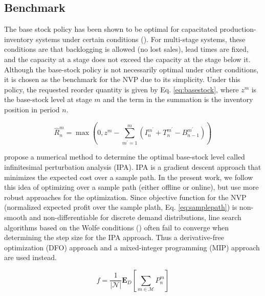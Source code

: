 \documentclass[12pt]{article}
\begin{document}
\subsection{Benchmark}

The base stock policy has been shown to be optimal for capacitated production-inventory systems under certain conditions (\cite{Kapuscinski1999OptimalSystems}). For multi-stage systems, these conditions are that backlogging is allowed (no lost sales), lead times are fixed, and the capacity at a stage does not exceed the capacity at the stage below it. Although the base-stock policy is not necessarily optimal under other conditions, it is chosen as the benchmark for the NVP due to its simplicity. Under this policy, the requested reorder quantity is given by Eq. \ref{eq:basestock}, where $z^m$ is the base-stock level at stage $m$ and the term in the summation is the inventory position in period $n$.  

\begin{equation}
    \hat{R}^m_n = \max\left(0,z^m - \sum_{m^\prime = 1}^m \left(I^{m^\prime}_n + T^{m^\prime}_n - B^{m^\prime}_{n-1}\right)\right)
    \label{eq:basestock}
\end{equation}

\cite{Glasserman1995SensitivitySystems} propose a numerical method to determine the optimal base-stock level called infinitesimal perturbation analysis (IPA). IPA is a gradient descent approach that minimizes the expected cost over a sample path. In the present work, we follow this idea of optimizing over a sample path (either offline or online), but use more robust approaches for the optimization. Since objective function for the NVP (normalized expected profit over the sample plath, Eq. \ref{eq:samplepath}) is non-smooth and non-differentiable for discrete demand distributions, line search algorithms based on the Wolfe conditions (\cite{Nocedal2006NumericalOptimization}) often fail to converge when determining the step size for the IPA approach. Thus a derivative-free optimization (DFO) approach and a mixed-integer programming (MIP) approach are used instead. 

\begin{equation}
    f = \frac{1}{|\mathcal{N}|} \mathbf{E}_D \left[\sum_{m\in \mathcal{M}} P^m_n\right]
    \label{eq:samplepath}
\end{equation}
\end{document}
